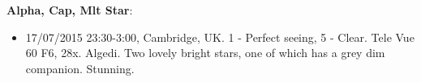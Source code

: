 {\bf Alpha, Cap, Mlt Star}:
\begin{itemize}
\item 17/07/2015 23:30-3:00, Cambridge, UK. 1 - Perfect seeing, 5 - Clear. Tele Vue 60 F6, 28x. Algedi. Two lovely bright stars, one of which has a grey dim companion. Stunning.
\end{itemize}
